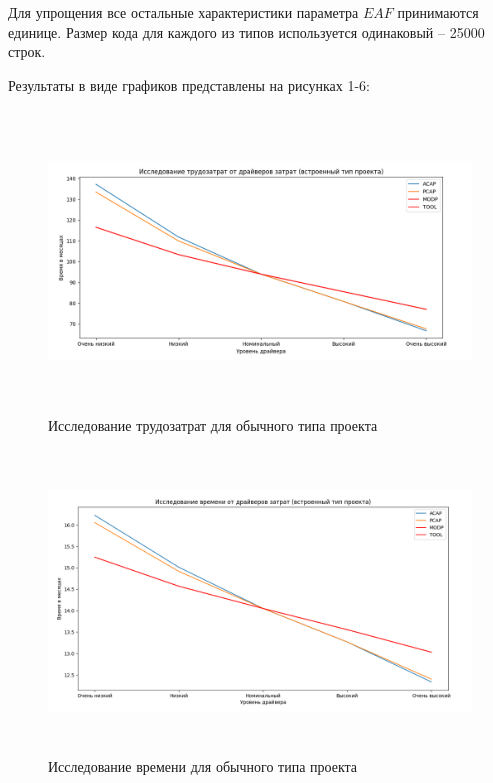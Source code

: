Для упрощения все остальные характеристики параметра $EAF$ принимаются единице.
Размер кода для каждого из типов используется одинаковый -- 25000 строк.

Результаты в виде графиков представлены на рисунках 1-6:
\FloatBarrier
\begin{figure}[h]	
	\begin{center}
		\includegraphics[width=\linewidth, height=8cm]{inc/work1.png}
	\end{center}
	\captionsetup{justification=centering}
	\caption{Исследование трудозатрат для обычного типа проекта}
\end{figure}
\FloatBarrier 

\FloatBarrier
\begin{figure}[h]	
	\begin{center}
		\includegraphics[width=\linewidth, height=8cm]{inc/time1.png}
	\end{center}
	\captionsetup{justification=centering}
	\caption{Исследование времени для обычного типа проекта}
\end{figure}
\FloatBarrier 

